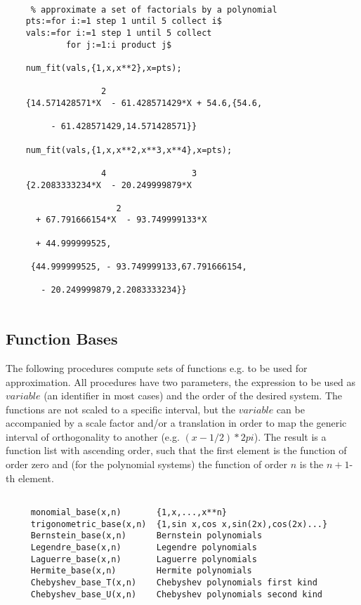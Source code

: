 \begin{verbatim}

     % approximate a set of factorials by a polynomial
    pts:=for i:=1 step 1 until 5 collect i$
    vals:=for i:=1 step 1 until 5 collect
            for j:=1:i product j$

    num_fit(vals,{1,x,x**2},x=pts);

                   2
    {14.571428571*X  - 61.428571429*X + 54.6,{54.6,

         - 61.428571429,14.571428571}}

    num_fit(vals,{1,x,x**2,x**3,x**4},x=pts);

                   4                 3
    {2.2083333234*X  - 20.249999879*X

                      2
      + 67.791666154*X  - 93.749999133*X

      + 44.999999525,

     {44.999999525, - 93.749999133,67.791666154,

       - 20.249999879,2.2083333234}}


\end{verbatim}

\subsection{Function Bases}

The following procedures compute sets of functions
e.g. to be used for approximation.
All procedures have
two parameters, the expression to be used as $variable$
(an identifier in most cases) and the
order of the desired system.
The functions are not scaled to a specific interval, but
the $variable$ can be accompanied by a scale factor
and/or a translation
in order to map the generic interval of orthogonality to another
(e.g. $(x- 1/2 ) * 2 pi$).
The result is a function list with ascending order, such that
the first element is the function of order zero and (for
the polynomial systems) the function of order $n$ is the $n+1$-th
element.

\begin{verbatim}

     monomial_base(x,n)       {1,x,...,x**n}
     trigonometric_base(x,n)  {1,sin x,cos x,sin(2x),cos(2x)...}
     Bernstein_base(x,n)      Bernstein polynomials
     Legendre_base(x,n)       Legendre polynomials
     Laguerre_base(x,n)       Laguerre polynomials
     Hermite_base(x,n)        Hermite polynomials
     Chebyshev_base_T(x,n)    Chebyshev polynomials first kind
     Chebyshev_base_U(x,n)    Chebyshev polynomials second kind

\end{verbatim}

